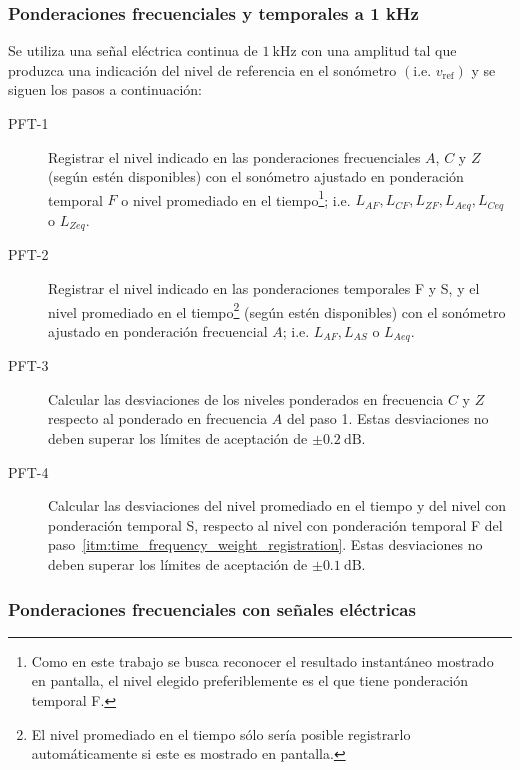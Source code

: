 \subsubsection{Ponderaciones frecuenciales y temporales a 1 kHz}
Se utiliza una señal eléctrica continua de $\qty{1}{\kHz}$ con una amplitud tal que produzca una indicación del nivel de referencia en el sonómetro $\left(\text{i.e. } v_{\mathrm{ref}}\right)$  y se siguen los pasos a continuación:
%
\begin{description}
    \item[PFT-1] Registrar el nivel indicado en las ponderaciones frecuenciales $A$, $C$ y $Z$ (según estén disponibles) con el sonómetro ajustado en ponderación temporal $F$ o nivel promediado en el tiempo\footnote{Como en este trabajo se busca reconocer el resultado instantáneo mostrado en pantalla, el nivel elegido preferiblemente es el que tiene ponderación temporal F.}; i.e. $L_{AF}, L_{CF}, L_{ZF}, L_{Aeq}, L_{Ceq}$ o $L_{Zeq}$.

    \item[PFT-2\label{itm:time_frequency_weight_registration}] Registrar el nivel indicado en las ponderaciones temporales F y S, y el nivel promediado en el tiempo\footnote{El nivel promediado en el tiempo sólo sería posible registrarlo automáticamente si este es mostrado en pantalla.} (según estén disponibles) con el sonómetro ajustado en ponderación frecuencial $A$; i.e. $L_{AF}, L_{AS}$ o $L_{Aeq}$.

    \item[PFT-3] Calcular las desviaciones de los niveles ponderados en frecuencia $C$ y $Z$ respecto al ponderado en frecuencia $A$ del paso 1.
    Estas desviaciones no deben superar los límites de aceptación de $\pm\qty{0.2}{\dB}$.

    \item[PFT-4] Calcular las desviaciones del nivel promediado en el tiempo y del nivel con ponderación temporal S, respecto al nivel con ponderación temporal F del paso~\ref{itm:time_frequency_weight_registration}.
    Estas desviaciones no deben superar los límites de aceptación de $\pm\qty{0.1}{\dB}$.
\end{description}

\subsubsection{Ponderaciones frecuenciales con señales eléctricas}

